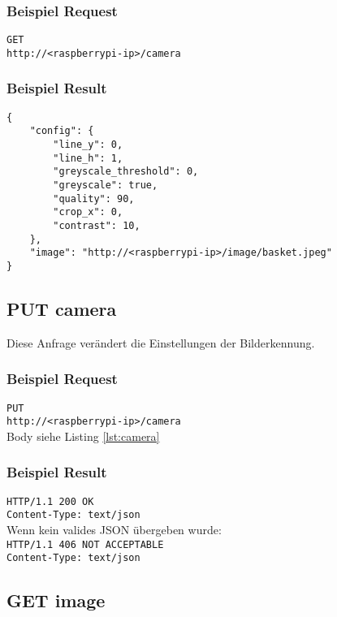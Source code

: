 \subsubsection{Beispiel Request}

\texttt{GET} \\
\texttt{http://<raspberrypi-ip>/camera}

\subsubsection{Beispiel Result}

\begin{lstlisting}[caption=GET camera Result, label=lst:camera, tabsize=2]
{
	"config": {
		"line_y": 0, 
		"line_h": 1, 
		"greyscale_threshold": 0,
		"greyscale": true, 
		"quality": 90, 
		"crop_x": 0, 
		"contrast": 10, 
	},
	"image": "http://<raspberrypi-ip>/image/basket.jpeg"
}
\end{lstlisting}

\subsection{PUT camera}

Diese Anfrage verändert die Einstellungen der Bilderkennung.

\subsubsection{Beispiel Request}

\texttt{PUT} \\
\texttt{http://<raspberrypi-ip>/camera} \\
Body siehe Listing \ref{lst:camera}

\subsubsection{Beispiel Result}

\texttt{HTTP/1.1 200 OK} \\
\texttt{Content-Type: text/json} \\

\noindent
Wenn kein valides JSON übergeben wurde: \\

\noindent
\texttt{HTTP/1.1 406 NOT ACCEPTABLE} \\
\texttt{Content-Type: text/json}

\subsection{GET image}

